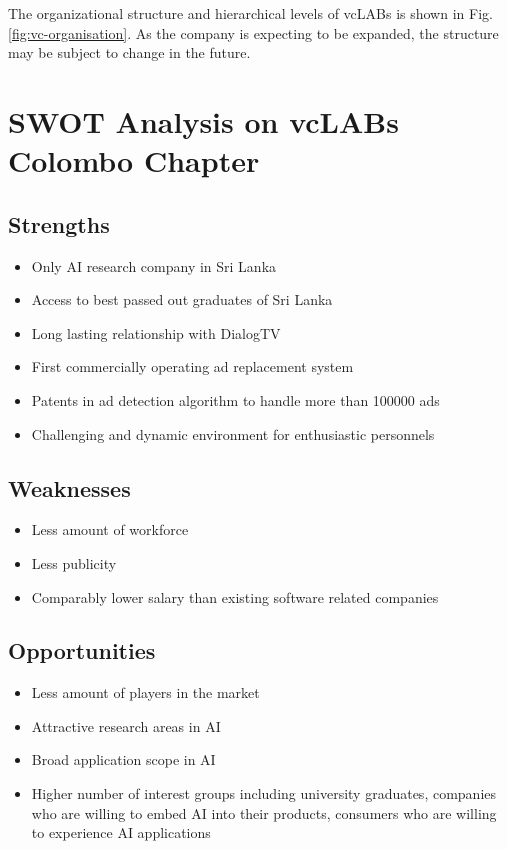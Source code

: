 The organizational structure and hierarchical levels of vcLABs is shown in Fig. \ref{fig:vc-organisation}. As the company is expecting to be expanded, the structure may be subject to change in the future.

\section{SWOT Analysis on vcLABs Colombo Chapter}
\subsection{Strengths}
\begin{itemize}
\item Only AI research company in Sri Lanka
\item Access to best passed out graduates of Sri Lanka
\item Long lasting relationship with DialogTV
\item First commercially operating ad replacement system
\item Patents in ad detection algorithm to handle more than 100000 ads
\item Challenging and dynamic environment for enthusiastic personnels
\end{itemize}
\subsection{Weaknesses}
\begin{itemize}
\item Less amount of workforce
\item Less publicity
\item Comparably lower salary than existing software related companies
\end{itemize}
\subsection{Opportunities}
\begin{itemize}
\item Less amount of players in the market
\item Attractive research areas in AI
\item Broad application scope in AI
\item Higher number of interest groups including university graduates, companies who are willing to embed AI into their products, consumers who are willing to experience AI applications
\end{itemize}

